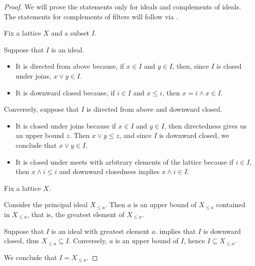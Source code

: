 \begin{proof}
  We will prove the statements only for ideals and complements of ideals. The statements for complements of filters will follow via .

   Fix a lattice \( X \) and a subset \( I \).

  \SufficiencySubProof* Suppose that \( I \) is an ideal.

  \begin{itemize}
    \item It is directed from above because, if \( x \in I \) and \( y \in I \), then, since \( I \) is closed under joins, \( x \vee y \in I \).
    \item It is downward closed because, if \( i \in I \) and \( x \leq i \), then \( x = i \wedge x \in I \).
  \end{itemize}

  \NecessitySubProof* Conversely, suppose that \( I \) is directed from above and downward closed.

  \begin{itemize}
    \item It is closed under joins because if \( x \in I \) and \( y \in I \), then directedness gives us an upper bound \( z \). Then \( x \vee y \leq z \), and since \( I \) is downward closed, we conclude that \( x \vee y \in I \).

    \item It is closed under meets with arbitrary elements of the lattice because if \( i \in I \), then \( x \wedge i \leq i \) and downward closedness implies \( x \wedge i \in I \).
  \end{itemize}

   Fix a lattice \( X \).

  \SufficiencySubProof* Consider the principal ideal \( X_{\leq a} \). Then \( a \) is an upper bound of \( X_{\leq a} \) contained in \( X_{\leq a} \), that is, the greatest element of \( X_{\leq a} \).

  \NecessitySubProof* Suppose that \( I \) is an ideal with greatest element \( a \).  implies that \( I \) is downward closed, thus \( X_{\leq a} \subseteq I \). Conversely, \( a \) is an upper bound of \( I \), hence \( I \subseteq X_{\leq a} \).

  We conclude that \( I = X_{\leq a} \).


\end{proof}
